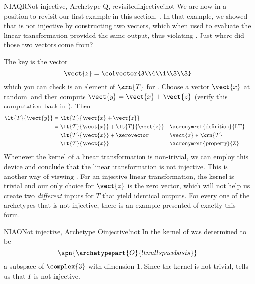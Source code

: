 \begin{example}{NIAQR}{Not injective, Archetype Q, revisited}{injective!not}
We are now in a position to revisit our first example in this section, .  In that example, we showed that  is not injective by constructing two vectors, which when used to evaluate the linear transformation provided the same output, thus violating .  Just where did those two vectors come from?\par
%
The key is the vector 
%
\begin{equation*}
\vect{z}=\colvector{3\\4\\1\\3\\3}
\end{equation*}
%
which you can check is an element of $\krn{T}$ for .  Choose a vector $\vect{x}$ at random, and then compute $\vect{y}=\vect{x}+\vect{z}$ (verify this computation back in ).  Then 
%
\begin{align*}
\lt{T}{\vect{y}}&=\lt{T}{\vect{x}+\vect{z}}\\
&=\lt{T}{\vect{x}}+\lt{T}{\vect{z}}&&\text{\acronymref{definition}{LT}}\\
&=\lt{T}{\vect{x}}+\zerovector&&\vect{z}\in\krn{T}\\
&=\lt{T}{\vect{x}}&&\text{\acronymref{property}{Z}}
\end{align*}
%
Whenever the kernel of a linear transformation is non-trivial, we can employ this device and conclude that the linear transformation is not injective.  This is another way of viewing .  For an injective linear transformation, the kernel is trivial and our only choice for $\vect{z}$ is the zero vector, which will not help us create two {\em different} inputs for $T$ that yield identical outputs.  For every one of the archetypes that is not injective, there is an example presented of exactly this form.
%
\end{example}
%
\begin{example}{NIAO}{Not injective, Archetype O}{injective!not}
In  the kernel of  was determined to be 
%
\begin{equation*}
\spn{\archetypepart{O}{ltnullspacebasis}}
\end{equation*}
%
a subspace of $\complex{3}$ with dimension 1.  Since the kernel is not trivial,  tells us that $T$ is not injective.
%
\end{example}
